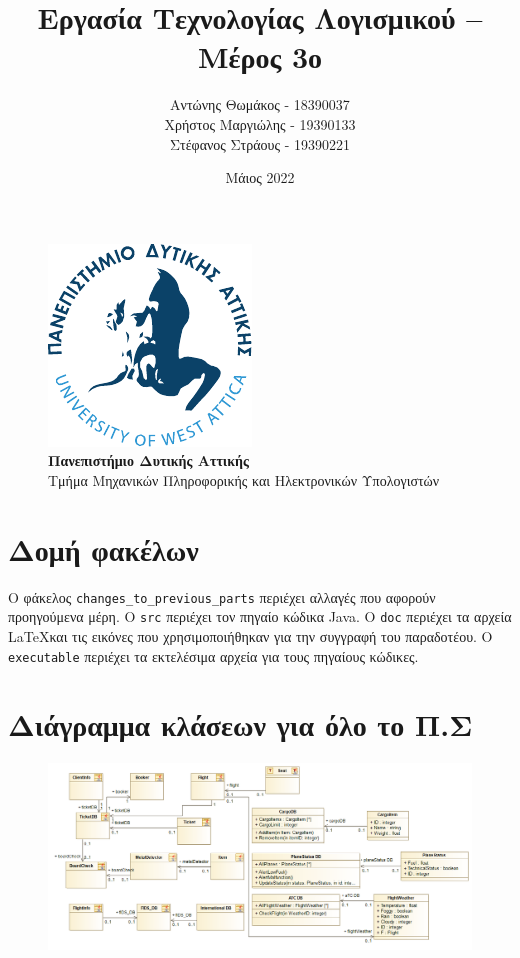 \documentclass[12pt]{article}
\title{Εργασία Τεχνολογίας Λογισμικού -- Μέρος 3ο}
\author{Αντώνης Θωμάκος - 18390037 \\
Χρήστος Μαργιώλης - 19390133 \\
Στέφανος Στράους - 19390221}
\date{Μάιος 2022}
\begin{document}
\begin{titlepage}
        \maketitle
        \begin{figure}[t!]
        \begin{center}
        \includegraphics[scale=1.0]{./res/uniwa-logo.pdf} \\
        \Large
        \textbf{Πανεπιστήμιο Δυτικής Αττικής} \\
        \large
        Τμήμα Μηχανικών Πληροφορικής και Ηλεκτρονικών Υπολογιστών
        \end{center}
        \end{figure}
\end{titlepage}

\renewcommand{\contentsname}{Περιεχόμενα}
\tableofcontents
\pagebreak

\section{Δομή φακέλων}

Ο φάκελος \lstinline{changes_to_previous_parts} περιέχει αλλαγές που αφορούν
προηγούμενα μέρη. Ο \lstinline{src} περιέχει τον πηγαίο κώδικα Java. Ο
\lstinline{doc} περιέχει τα αρχεία \LaTeX και τις εικόνες που χρησιμοποιήθηκαν
για την συγγραφή του παραδοτέου. Ο \lstinline{executable} περιέχει τα
εκτελέσιμα αρχεία για τους πηγαίους κώδικες.

\section{Διάγραμμα κλάσεων για όλο το Π.Σ}

\begin{figure}[H]
	\centering
	\includegraphics[width=\linewidth]{./res/AllClasses.png}
\end{figure}
\end{document}
